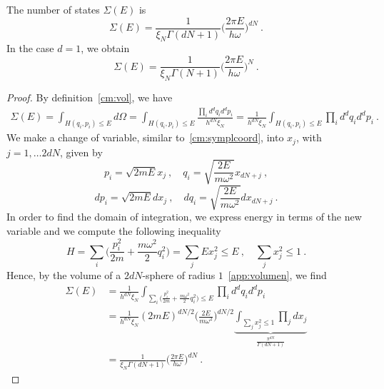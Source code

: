     The number of states $\Sigma(E)$ is 
    \begin{equation*}
        \Sigma(E) = \frac{1}{\xi_N\Gamma(dN + 1)} \Big ( \frac{2 \pi E}{h \omega}\Big)^{dN} ~.
    \end{equation*}
    In the case $d = 1$, we obtain 
    \begin{equation*}
        \Sigma(E) = \frac{1}{\xi_N \Gamma(N+1)} \Big ( \frac{2 \pi E}{h \omega}\Big)^{N} ~.
    \end{equation*}
    \begin{proof}
        By definition~\eqref{cm:vol}, we have
        \begin{equation*}
        \begin{aligned}
            \Sigma (E) = \int_{H (q_i, p_i) \leq E} d\Omega = \int_{H (q_i, p_i) \leq E} \frac{\prod_i d^d q_i d^d p_i}{h^{dN} \xi_N} = \frac{1}{h^{dN} \xi_N} \int_{H (q_i, p_i) \leq E} \prod_i d^d q_i d^d p_i ~.
        \end{aligned}
        \end{equation*}
        We make a change of variable, similar to~\eqref{cm:symplcoord}, into $x_j$, with $j = 1, \ldots 2dN$, given by
        \begin{equation*}
            p_i = \sqrt{2mE} x_j ~, \quad q_i = \sqrt{\frac{2E}{m\omega^2}} x_{dN + j} ~,
        \end{equation*}
        \begin{equation*}
            d p_i = \sqrt{2mE} dx_j  ~, \quad d q_i = \sqrt{\frac{2E}{m\omega^2}} d x_{dN + j} ~.
        \end{equation*}
        In order to find the domain of integration, we express energy in terms of the new variable and we compute the following inequality
        \begin{equation*}
            H = \sum_i \Big ( \frac{p^2_i}{2m} + \frac{m \omega^2}{2} q_i^2 \Big ) = \sum_j E x_j^2 \leq E ~, \quad \sum_j x^2_j \leq 1 ~.
        \end{equation*}
        Hence, by the volume of a $2dN$-sphere of radius $1$~\eqref{app:volumen}, we find
        \begin{equation*}
        \begin{aligned}
            \Sigma (E) & = \frac{1}{h^{dN} \xi_N} \int_{\sum_i \Big ( \frac{p^2_i}{2m} + \frac{m \omega^2}{2} q_i^2 \Big ) \leq E} \prod_i d^d q_i d^d p_i \\ & = \frac{1}{h^{dN} \xi_N} (2mE)^{dN/2} \Big (\frac{2E}{m\omega^2} \Big )^{dN/2} \underbrace{\int_{\sum_j x^2_j \leq 1} \prod_j d x_j}_{ \frac{\pi^{dN}}{\Gamma (dN + 1)}} \\ & = \frac{1}{\xi_N \Gamma (dN + 1)} \Big (\frac{2 \pi E}{h \omega} \Big )^{dN} ~.
        \end{aligned}
        \end{equation*}
    \end{proof}
